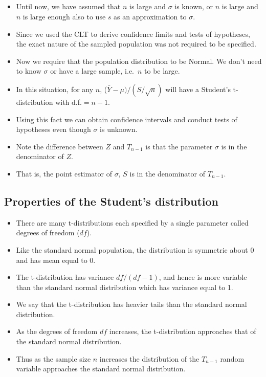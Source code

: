 \documentclass[
  letterpaper,
  DIV=11,
  numbers=noendperiod]{scrartcl}
\begin{document}
\subsection{}\label{section-2}

\begin{itemize}
\item
  Until now, we have assumed that \(n\) is large and \(\sigma\) is
  known, or \(n\) is large and \(n\) is large enough also to use \(s\)
  as an approximation to \(\sigma\).
\item
  Since we used the CLT to derive confidence limits and tests of
  hypotheses, the exact nature of the sampled population was not
  required to be specified.
\item
  Now we require that the population distribution to be Normal. We don't
  need to know \(\sigma\) or have a large sample, i.e.~\(n\) to be
  large.
\item
  In this situation, for any \(n\), (\(\bar{Y} - \mu)/(S/\sqrt{n})\)
  will have a Student's t-distribution with d.f.\(= n-1.\)
\item
  Using this fact we can obtain confidence intervals and conduct tests
  of hypotheses even though \(\sigma\) is unknown.
\item
  Note the difference between \(Z\) and \(T_{n-1}\) is that the
  parameter \(\sigma\) is in the denominator of \(Z\).
\item
  That is, the point estimator of \(\sigma\), \(S\) is in the
  denominator of \(T_{n-1}\).
\end{itemize}

\subsection{Properties of the Student's
distribution}\label{properties-of-the-students-distribution}

\begin{itemize}
\item
  There are many t-distributions each specified by a single parameter
  called {degrees of freedom (\(df\))}.
\item
  Like the standard normal population, the distribution is {symmetric}
  about 0 and has mean equal to 0.
\item
  The t-distribution has variance \(df/(df-1)\), and hence is more
  variable than the standard normal distribution which has variance
  equal to 1.
\item
  We say that the t-distribution has {heavier tails} than the standard
  normal distribution.
\item
  As the degrees of freedom \(df\) increases, the t-distribution
  approaches that of the standard normal distribution.
\item
  Thus as the sample size \(n\) increases the distribution of the
  \(T_{n-1}\) random variable approaches the standard normal
  distribution.
\end{itemize}
\end{document}
